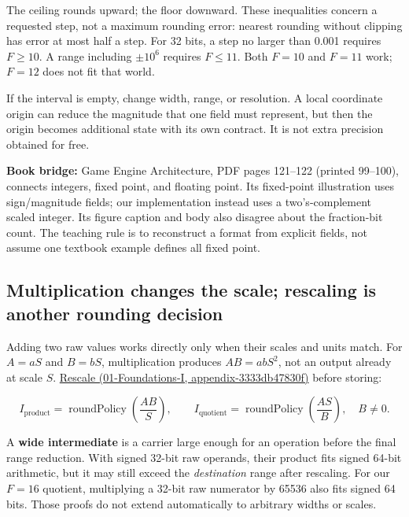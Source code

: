 The ceiling rounds upward; the floor downward. These inequalities concern a requested step, not a maximum rounding error: nearest rounding without clipping has error at most half a step. For 32 bits, a step no larger than 0.001 requires \(F\ge10\). A range including \(\pm10^6\) requires \(F\le11\). Both \(F=10\) and \(F=11\) work; \(F=12\) does not fit that world.

If the interval is empty, change width, range, or resolution. A local coordinate origin can reduce the magnitude that one field must represent, but then the origin becomes additional state with its own contract. It is not extra precision obtained for free.

\textbf{Book bridge:} Game Engine Architecture, PDF pages 121--122 (printed 99--100), connects integers, fixed point, and floating point. Its fixed-point illustration uses sign/magnitude fields; our implementation instead uses a two's-complement scaled integer. Its figure caption and body also disagree about the fraction-bit count. The teaching rule is to reconstruct a format from explicit fields, not assume one textbook example defines all fixed point.

\subsection{Multiplication changes the scale; rescaling is another rounding decision}\label{05-engine-i-ch001-multiplication-changes-the-scale-rescaling-is-another-rounding-decision}

Adding two raw values works directly only when their scales and units match. For \(A=aS\) and \(B=bS\), multiplication produces \(AB=abS^2\), not an output already at scale \(S\). \href{../01-Foundations-I/main.pdf\#nameddest=appendix-3333db47830f}{Rescale (01-Foundations-I, appendix-3333db47830f)} before storing:

\[
I_{\mathrm{product}}=\operatorname{roundPolicy}\!\left(\frac{AB}{S}\right),
\qquad
I_{\mathrm{quotient}}=\operatorname{roundPolicy}\!\left(\frac{AS}{B}\right),\quad B\ne0.
\]

A \textbf{wide intermediate} is a carrier large enough for an operation before the final range reduction. With signed 32-bit raw operands, their product fits signed 64-bit arithmetic, but it may still exceed the \emph{destination} range after rescaling. For our \(F=16\) quotient, multiplying a 32-bit raw numerator by 65536 also fits signed 64 bits. Those proofs do not extend automatically to arbitrary widths or scales.

